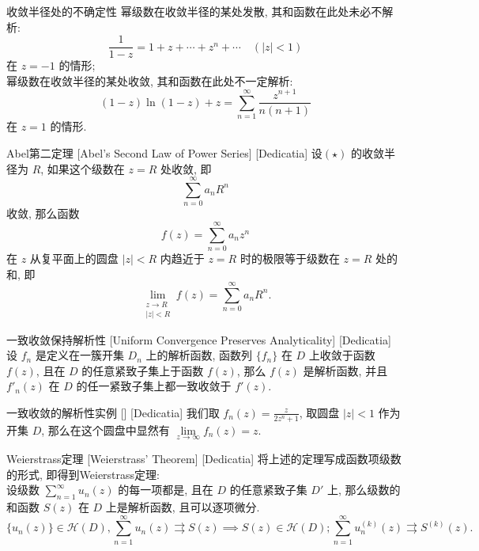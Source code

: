 \documentclass[UTF8]{ctexart}
\begin{document}
        \begin{cxmp}
            {收敛半径处的不确定性}
            幂级数在收敛半径的某处发散, 其和函数在此处未必不解析: 
            \[\frac{1}{1-z}=1+z+\cdots+z^n+\cdots\quad(|z|<1) \]
            在 \(z=-1\) 的情形; \\
            幂级数在收敛半径的某处收敛, 其和函数在此处不一定解析: 
            \[(1-z)\ln(1-z)+z=\sum_{n=1}^{\infty}\frac{z^{n+1}}{n(n+1)}\]
            在 \(z=1\) 的情形. 
        \end{cxmp}

        \begin{thm}
            [UUID]
            {Abel第二定理}
            [Abel's Second Law of Power Series]
            [Dedicatia]
            设\PowerSeries  \((\star)\) 的收敛半径为 \(R\), 如果这个级数在 \(z = R\) 处收敛, 即
            \[\sum_{n=0}^{\infty} a_n R^n\]
            收敛, 那么函数
            \[f(z) = \sum_{n=0}^{\infty} a_n z^n\]
            在 \(z\) 从复平面上的圆盘 \(|z| < R\) 内趋近于 \(z = R\) 时的极限等于级数在 \(z = R\) 处的和, 即
            \[\lim_{\substack{z \to R \\ |z| < R}} f(z) = \sum_{n=0}^{\infty} a_n R^n.\]
        \end{thm}

        \begin{thm}
            [UUID]
            {一致收敛保持解析性}
            [Uniform Convergence Preserves Analyticality]
            [Dedicatia]
            设 \(f_n\) 是定义在一簇开集 \(D_n\) 上的解析函数, 函数列 \(\{f_n\}\) 在 \(D\) 上收敛于函数 \(f(z)\), 且在 \(D\) 的任意紧致子集上\UniformConvergence 于函数 \(f(z)\), 那么 \(f(z)\) 是解析函数, 并且 \(f'_n(z)\) 在 \(D\) 的任一紧致子集上都一致收敛于 \(f'(z)\).
        \end{thm}

        \begin{xmp}
            [UUID]
            {一致收敛的解析性实例}
            []
            [Dedicatia]
            我们取 \(f_n(z)=\frac{z}{2z^n+1}\), 取圆盘 \(|z|<1\) 作为开集 \(D\), 那么在这个圆盘中显然有 \(\lim\limits_{z\to\infty}f_n(z)=z\).
        \end{xmp}

        \begin{thm}
            [UUID]
            {Weierstrass定理}
            [Weierstrass' Theorem]
            [Dedicatia]
            将上述的定理写成函数项级数的形式, 即得到Weierstrass定理: \\
            设级数 \(\sum_{n = 1}^{\infty} u_n(z)\) 的每一项都是, 且在 \(D\) 的任意紧致子集 \(D'\) 上\UniformConvergence, 那么级数的和函数 \(S(z)\) 在 \(D\) 上是解析函数, 且可以逐项微分. 
            \[\{u_n(z)\}\in\mathcal{H}(D),\sum_{n = 1}^{\infty} u_n(z)\rightrightarrows S(z)\implies S(z)\in\mathcal{H}(D); \sum_{n = 1}^{\infty} u_n^{(k)}(z)\rightrightarrows S^{(k)}(z).\]
        \end{thm}
\end{document}
